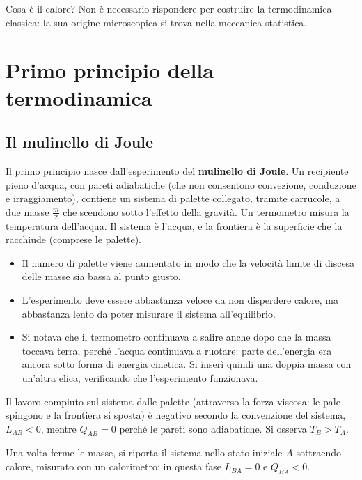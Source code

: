 \documentclass[11pt, a4paper, openright]{book}
\theoremstyle{plain}
\theoremstyle{definition}
\theoremstyle{remark}
\begin{document}
Cosa è il calore? Non è necessario rispondere per costruire la termodinamica classica: la sua origine microscopica si trova nella meccanica statistica.

\section{Primo principio della termodinamica}
\subsection{Il mulinello di Joule}
Il primo principio nasce dall'esperimento del \textbf{mulinello di Joule}. Un recipiente pieno d'acqua, con pareti adiabatiche (che non consentono convezione, conduzione e irraggiamento), contiene un sistema di palette collegato, tramite carrucole, a due masse $\frac{m}{2}$ che scendono sotto l'effetto della gravità. Un termometro misura la temperatura dell'acqua. Il sistema è l'acqua, e la frontiera è la superficie che la racchiude (comprese le palette).
\begin{itemize}
    \item Il numero di palette viene aumentato in modo che la velocità limite di discesa delle masse sia bassa al punto giusto.
    \item L'esperimento deve essere abbastanza veloce da non disperdere calore, ma abbastanza lento da poter misurare il sistema all'equilibrio.
    \item Si notava che il termometro continuava a salire anche dopo che la massa toccava terra, perché l'acqua continuava a ruotare: parte dell'energia era ancora sotto forma di energia cinetica. Si inserì quindi una doppia massa con un'altra elica, verificando che l'esperimento funzionava.
\end{itemize}
Il lavoro compiuto sul sistema dalle palette (attraverso la forza viscosa: le pale spingono e la frontiera si sposta) è negativo secondo la convenzione del sistema, $L_{AB} < 0$, mentre $Q_{AB} = 0$ perché le pareti sono adiabatiche. Si osserva $T_B > T_A$.

Una volta ferme le masse, si riporta il sistema nello stato iniziale $A$ sottraendo calore, misurato con un calorimetro: in questa fase $L_{BA} = 0$ e $Q_{BA} < 0$.
\end{document}
